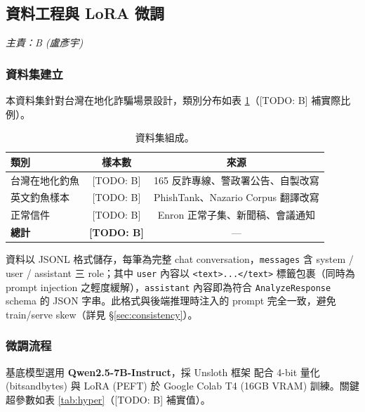 \documentclass[11pt, a4paper]{article}
\begin{document}
\subsection{資料工程與 LoRA 微調} \label{sec:bfinetune}
\textit{主責：B (盧彥宇)}

\subsubsection{資料集建立}
本資料集針對台灣在地化詐騙場景設計，類別分布如表 \ref{tab:dataset}（[TODO: B] 補實際比例）。

\begin{table}[h]
  \centering
  \small
  \begin{tabular}{lcc}
    \toprule
    \textbf{類別} & \textbf{樣本數} & \textbf{來源} \\
    \midrule
    台灣在地化釣魚 & [TODO: B] & 165 反詐專線、警政署公告、自製改寫 \\
    英文釣魚樣本   & [TODO: B] & PhishTank、Nazario Corpus 翻譯改寫 \\
    正常信件       & [TODO: B] & Enron 正常子集、新聞稿、會議通知 \\
    \midrule
    \textbf{總計}  & \textbf{[TODO: B]} & — \\
    \bottomrule
  \end{tabular}
  \caption{資料集組成。}
  \label{tab:dataset}
\end{table}

資料以 JSONL 格式儲存，每筆為完整 chat conversation，\texttt{messages} 含 system / user / assistant 三 role；其中 \texttt{user} 內容以 \texttt{<text>...</text>} 標籤包裹（同時為 prompt injection 之輕度緩解），\texttt{assistant} 內容即為符合 \texttt{AnalyzeResponse} schema 的 JSON 字串。此格式與後端推理時注入的 prompt 完全一致，避免 train/serve skew（詳見 \S\ref{sec:consistency}）。

\subsubsection{微調流程}
基底模型選用 \textbf{Qwen2.5-7B-Instruct}，採 Unsloth 框架\cite{unsloth2024} 配合 4-bit 量化 (bitsandbytes) 與 LoRA\cite{hu2021lora} (PEFT) 於 Google Colab T4 (16GB VRAM) 訓練。關鍵超參數如表 \ref{tab:hyper}（[TODO: B] 補實值）。
\end{document}
